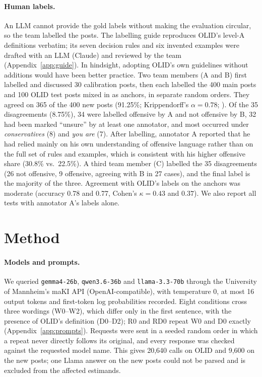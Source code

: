 \documentclass[11pt]{article}
\begin{document}
\paragraph{Human labels.} An LLM cannot provide the gold labels without making the evaluation circular, so the team labelled the posts. The labelling guide reproduces OLID's level-A definitions verbatim; its seven decision rules and six invented examples were drafted with an LLM (Claude) and reviewed by the team (Appendix~\ref{app:guide}). In hindsight, adopting OLID's own guidelines without additions would have been better practice. Two team members (A and B) first labelled and discussed 30 calibration posts, then each labelled the 400 main posts and 100 OLID test posts mixed in as anchors, in separate random orders. They agreed on 365 of the 400 new posts (91.25\%; Krippendorff's $\alpha = 0.78$; \citealp{krippendorff2018content}). Of the 35 disagreements (8.75\%), 34 were labelled offensive by A and not offensive by B, 32 had been marked ``unsure'' by at least one annotator, and most occurred under \emph{conservatives} (8) and \emph{you are} (7). After labelling, annotator A reported that he had relied mainly on his own understanding of offensive language rather than on the full set of rules and examples, which is consistent with his higher offensive share (30.8\% vs.\ 22.5\%). A third team member (C) labelled the 35 disagreements (26 not offensive, 9 offensive, agreeing with B in 27 cases), and the final label is the majority of the three. Agreement with OLID's labels on the anchors was moderate (accuracy 0.78 and 0.77, Cohen's $\kappa = 0.43$ and $0.37$). We also report all tests with annotator A's labels alone.

\section{Method}

\paragraph{Models and prompts.} We queried \texttt{gemma4-26b}, \texttt{qwen3.6-36b} and \texttt{llama-3.3-70b} through the University of Mannheim's maKI API (OpenAI-compatible), with temperature 0, at most 16 output tokens and first-token log probabilities recorded. Eight conditions cross three wordings (W0--W2), which differ only in the first sentence, with the presence of OLID's definition (D0--D2); R0 and RD0 repeat W0 and D0 exactly (Appendix~\ref{app:prompts}). Requests were sent in a seeded random order in which a repeat never directly follows its original, and every response was checked against the requested model name. This gives 20,640 calls on OLID and 9,600 on the new posts; one Llama answer on the new posts could not be parsed and is excluded from the affected estimands.
\end{document}
